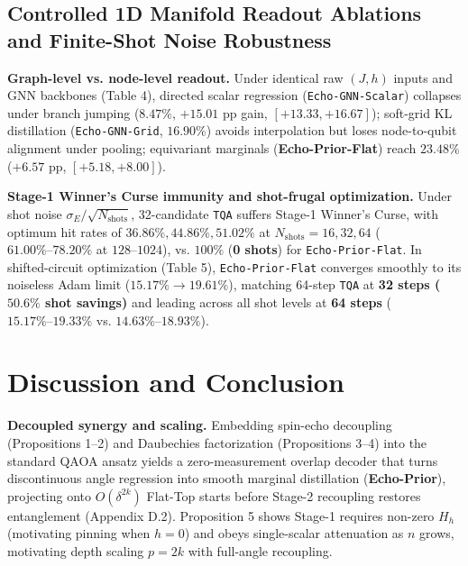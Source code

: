 \documentclass{article}
\theoremstyle{plain}
\theoremstyle{definition}
\begin{document}
\subsection{Controlled 1D Manifold Readout Ablations and Finite-Shot Noise Robustness}\label{subsec:5_4}



\textbf{Graph-level vs. node-level readout.} Under identical raw $(J,h)$ inputs and GNN backbones (Table 4), directed scalar regression (\texttt{Echo-GNN-Scalar}) collapses under branch jumping ($8.47\%$, $+15.01$ pp gain, $[+13.33, +16.67]$); soft-grid KL distillation (\texttt{Echo-GNN-Grid}, $16.90\%$) avoids interpolation but loses node-to-qubit alignment under pooling; equivariant marginals (\textbf{Echo-Prior-Flat}) reach \textbf{$\mathbf{23.48}\%$} ($+6.57$ pp, $[+5.18, +8.00]$).

\textbf{Stage-1 Winner's Curse immunity and shot-frugal optimization.} Under shot noise $\sigma_E/\sqrt{N_{\mathrm{shots}}}$, 32-candidate \texttt{TQA} suffers Stage-1 Winner's Curse, with optimum hit rates of $\mathbf{36.86}\%, \mathbf{44.86}\%, \mathbf{51.02}\%$ at $N_{\mathrm{shots}}=16, 32, 64$ ($61.00\%\text{--}78.20\%$ at $128\text{--}1024$), vs. \textbf{$100\%$} (\textbf{0 shots}) for \texttt{Echo-Prior-Flat}. In shifted-circuit optimization (Table 5), \texttt{Echo-Prior-Flat} converges smoothly to its noiseless Adam limit ($15.17\%\to 19.61\%$), matching 64-step \texttt{TQA} at \textbf{32 steps ($50.6\%$ shot savings)} and leading across all shot levels at \textbf{64 steps} ($15.17\%\text{--}19.33\%$ vs. $14.63\%\text{--}18.93\%$).

\section{Discussion and Conclusion}\label{sec:6}

\textbf{Decoupled synergy and scaling.} Embedding spin-echo decoupling (Propositions 1--2) and Daubechies factorization (Propositions 3--4) into the standard QAOA ansatz yields a zero-measurement overlap decoder that turns discontinuous angle regression into smooth marginal distillation (\textbf{Echo-Prior}), projecting onto $O(\delta^{2k})$ Flat-Top starts before Stage-2 recoupling restores entanglement (Appendix D.2). Proposition 5 shows Stage-1 requires non-zero $H_h$ (motivating pinning when $h=0$) and obeys single-scalar attenuation as $n$ grows, motivating depth scaling $p=2k$ with full-angle recoupling.

\clearpage
\end{document}
